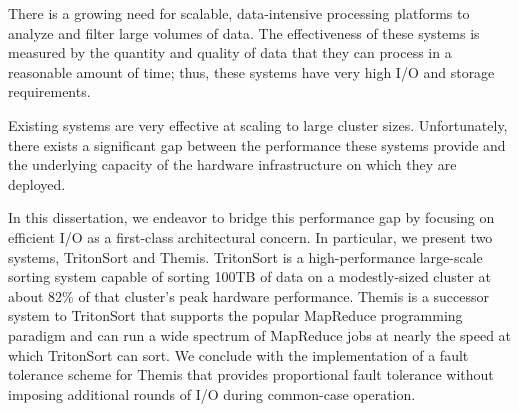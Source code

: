 \begin{dissertationabstract}
There is a growing need for scalable, data-intensive processing platforms to
analyze and filter large volumes of data. The effectiveness of these systems is
measured by the quantity and quality of data that they can process in a
reasonable amount of time; thus, these systems have very high I/O and storage
requirements.

Existing systems are very effective at scaling to large cluster
sizes. Unfortunately, there exists a significant gap between the performance
these systems provide and the underlying capacity of the hardware
infrastructure on which they are deployed.

In this dissertation, we endeavor to bridge this performance gap by focusing on
efficient I/O as a first-class architectural concern. In particular, we present
two systems, TritonSort and Themis. TritonSort is a high-performance
large-scale sorting system capable of sorting 100TB of data on a modestly-sized
cluster at about 82\% of that cluster's peak hardware performance. Themis is a
successor system to TritonSort that supports the popular MapReduce programming
paradigm and can run a wide spectrum of MapReduce jobs at nearly the speed at
which TritonSort can sort. We conclude with the implementation of a fault
tolerance scheme for Themis that provides proportional fault tolerance without
imposing additional rounds of I/O during common-case operation.
\end{dissertationabstract}
